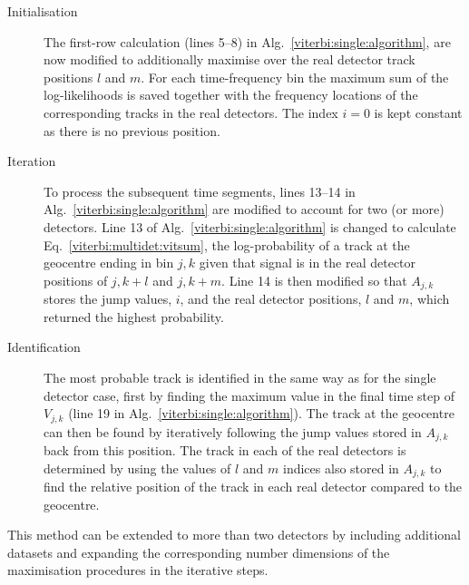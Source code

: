 \begin{description}
\item[Initialisation] The first-row calculation (lines 5--8) in Alg.~\ref{viterbi:single:algorithm}, are now modified to additionally maximise over the real detector track positions $l$ and $m$. For each time-frequency bin the maximum sum of the log-likelihoods is saved together with the frequency locations of the corresponding tracks in the real detectors. The index $i=0$ is kept constant as there is no previous position.

\item[Iteration] To process the subsequent time segments, lines 13--14 in Alg.~\ref{viterbi:single:algorithm} are modified to account for two (or more) detectors. Line 13 of Alg.~\ref{viterbi:single:algorithm} is changed to calculate Eq.~\ref{viterbi:multidet:vitsum}, the log-probability of a track at the geocentre ending in bin $j,k$ given that signal is in the real detector positions of $j,k+l$ and $j,k+m$. Line 14 is then modified so that $A_{j,k}$ stores the jump values, $i$, and the real detector positions, $l$ and $m$, which returned the highest probability.

\item[Identification] The most probable track is identified in the same way as for the single detector case, first by finding the maximum value in the final time step of $V_{j,k}$ (line 19 in Alg.~\ref{viterbi:single:algorithm}). The track at the geocentre can then be found by iteratively following the jump values stored in $A_{j,k}$ back from this position. The track in each of the real detectors is determined by using the values of $l$ and $m$ indices also stored in $A_{j,k}$ to find the relative position of the track in each real detector compared to the geocentre.
%
\end{description}

This method can be extended to more than two detectors by including additional datasets and expanding the corresponding number dimensions of the maximisation procedures in the iterative steps.

